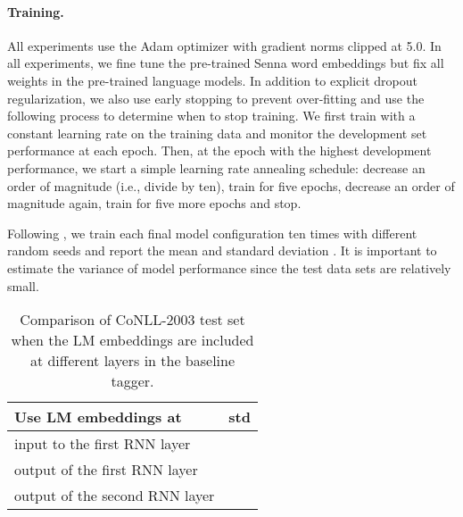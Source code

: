 \documentclass[11pt,a4paper]{article}
\begin{document}
\paragraph{Training.}
All experiments use the Adam optimizer \cite{Kingma2014AdamAM} with gradient norms clipped at 5.0.
In all experiments, we fine tune the pre-trained Senna word embeddings but fix all weights in the
pre-trained language models.  In addition to explicit dropout regularization, we also use early
stopping to prevent over-fitting and use
the following process to determine when to stop training.
We first train with a constant learning rate  on the training data and monitor the development set performance at each epoch.  Then, at the epoch with the highest development performance, we start a simple learning rate annealing schedule: decrease  an order of magnitude (i.e., divide by ten), train for five epochs, decrease
 an order of magnitude again, train for five more epochs and stop.

Following \citet{chiu-nichols-2016}, we train each final model configuration ten times with different random seeds and report the mean and standard deviation .
It is important to estimate the variance of model performance since the test data sets are relatively small.

\begin{table}[t]
\begin{center}
\begin{tabular}{l|l}
\hline \hline
\bf Use LM embeddings at & \bf  std \\ \hline
input to the first RNN layer &  \\
output of the first RNN layer &  \\
output of the second RNN layer &  \\
\hline \hline
\end{tabular}
\end{center}
\caption{\label{2003-table-lm-level} Comparison of CoNLL-2003 test set  when the LM embeddings are included at different layers in the baseline tagger.
}
\end{table}
\end{document}
